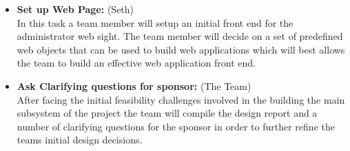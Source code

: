 \documentclass[Letter,11pt]{article}
\begin{document}
\begin{itemize}
			\item\textbf{Set up Web Page:} (Seth)\\
			In this task a team member will setup an initial front end for the administrator web sight. The team member will decide on a set of predefined web objects that can be used to build web applications which will best allows the team to build an effective web application front end. 
			
			\item\textbf{Ask Clarifying questions for sponsor:} (The Team)\\
			After facing the initial feasibility challenges involved in the building the main subsystem of the project the team will compile the design report and a number of clarifying questions for the sponsor in order to further refine the teams initial design decisions. 
		\end{itemize}
		
		
		
\end{document}
